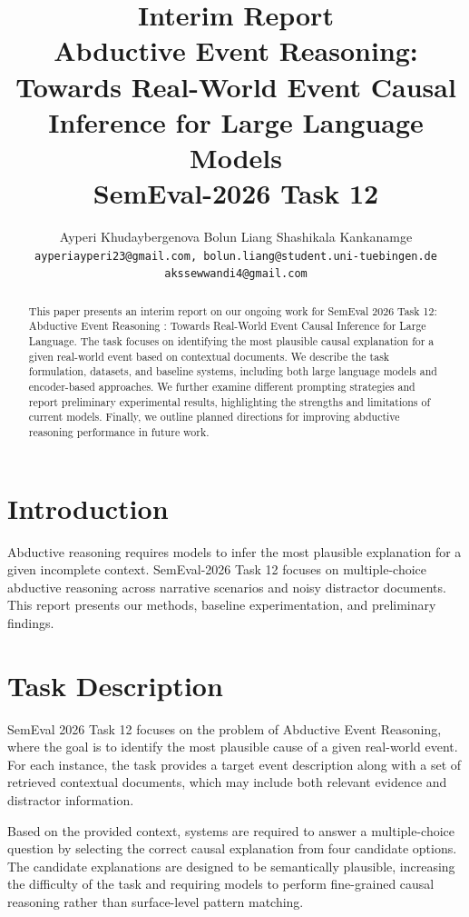 \documentclass[11pt]{article}
\title{Interim Report\\
Abductive Event Reasoning: Towards Real-World Event Causal Inference for Large Language Models\\ 

\large SemEval-2026 Task 12
}
\author{
  Ayperi Khudaybergenova \quad
  Bolun Liang \quad
  Shashikala Kankanamge \\
  \texttt{ayperiayperi23@gmail.com, bolun.liang@student.uni-tuebingen.de} \\
  \texttt{akssewwandi4@gmail.com}
}
\begin{document}
\maketitle

\begin{abstract}
This paper presents an interim report on our ongoing work for SemEval 2026 Task 12: Abductive Event Reasoning : Towards Real-World Event Causal Inference for Large Language. The task focuses on identifying the most plausible causal explanation for a given real-world event based on contextual documents. We describe the task formulation, datasets, and baseline systems, including both large language models and encoder-based approaches. We further examine different prompting strategies and report preliminary experimental results, highlighting the strengths and limitations of current models. Finally, we outline planned directions for improving abductive reasoning performance in future work.
\end{abstract}


\section{Introduction}
Abductive reasoning requires models to infer the most plausible explanation for a given incomplete context. SemEval-2026 Task 12 focuses on multiple-choice abductive reasoning across narrative scenarios and noisy distractor documents. This report presents our methods, baseline experimentation, and preliminary findings.

\section{Task Description}

SemEval 2026 Task 12 focuses on the problem of Abductive Event Reasoning, where the goal is to identify the most plausible cause of a given real-world event. For each instance, the task provides a target event description along with a set of retrieved contextual documents, which may include both relevant evidence and distractor information.

Based on the provided context, systems are required to answer a multiple-choice question by selecting the correct causal explanation from four candidate options. The candidate explanations are designed to be semantically plausible, increasing the difficulty of the task and requiring models to perform fine-grained causal reasoning rather than surface-level pattern matching.
\end{document}
